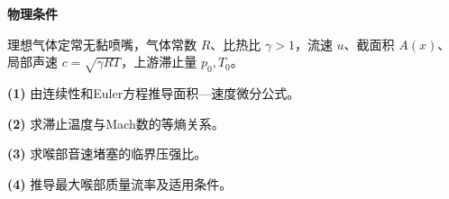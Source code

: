 \textbf{物理条件}\par 理想气体定常无黏喷嘴，气体常数 \(R\)、比热比 \(\gamma>1\)，流速 \(u\)、截面积 \(A(x)\)、局部声速 \(c=\sqrt{\gamma RT}\)，上游滞止量 \(p_0,T_0\)。
\par\noindent\textbf{(1)} 由连续性和Euler方程推导面积—速度微分公式。
\par\noindent\textbf{(2)} 求滞止温度与Mach数的等熵关系。
\par\noindent\textbf{(3)} 求喉部音速堵塞的临界压强比。
\par\noindent\textbf{(4)} 推导最大喉部质量流率及适用条件。
